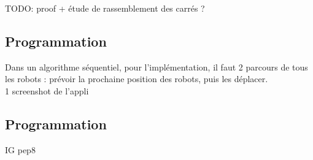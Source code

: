 

TODO: proof + étude de rassemblement des carrés ?

\subsection{Programmation}

Dans un algorithme séquentiel,
pour l'implémentation, il faut 2 parcours de tous les robots : prévoir la
prochaine position des robots, puis les déplacer. \\

1 screenshot de l'appli

\subsection{Programmation}
IG
pep8
